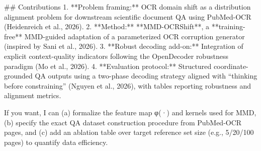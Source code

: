 ## Contributions  
1. **Problem framing:** OCR domain shift as a distribution alignment problem for downstream scientific document QA using PubMed-OCR (Heidenreich et al., 2026).  
2. **Method:** **MMD-OCRShift**, a **training-free** MMD-guided adaptation of a parameterized OCR corruption generator (inspired by Sani et al., 2026).  
3. **Robust decoding add-on:** Integration of explicit context-quality indicators following the OpenDecoder robustness paradigm (Mo et al., 2026).  
4. **Evaluation protocol:** Structured coordinate-grounded QA outputs using a two-phase decoding strategy aligned with “thinking before constraining” (Nguyen et al., 2026), with tables reporting robustness and alignment metrics.

If you want, I can (a) formalize the feature map φ(·) and kernels used for MMD, (b) specify the exact QA dataset construction procedure from PubMed-OCR pages, and (c) add an ablation table over target reference set size (e.g., 5/20/100 pages) to quantify data efficiency.
